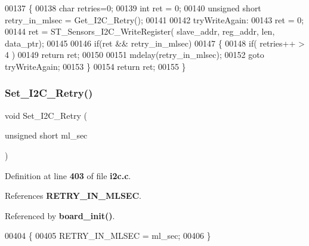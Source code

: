 \begin{DoxyCode}
00137 \{
00138   \textcolor{keywordtype}{char} retries=0;
00139   \textcolor{keywordtype}{int} ret = 0;
00140   \textcolor{keywordtype}{unsigned} \textcolor{keywordtype}{short} retry\_in\_mlsec = Get_I2C_Retry();
00141                               
00142 tryWriteAgain:  
00143   ret = 0;
00144   ret = ST_Sensors_I2C_WriteRegister( slave\_addr, reg\_addr, len, data\_ptr); 
00145 
00146   \textcolor{keywordflow}{if}(ret && retry\_in\_mlsec)
00147   \{
00148     \textcolor{keywordflow}{if}( retries++ > 4 )
00149         \textcolor{keywordflow}{return} ret;
00150     
00151     mdelay(retry\_in\_mlsec);
00152     \textcolor{keywordflow}{goto} tryWriteAgain;
00153   \}
00154   \textcolor{keywordflow}{return} ret;  
00155 \}
\end{DoxyCode}
\mbox{\label{i2c_8h_a463aa366d8082caef51ff67c162c0a19}} 
\subsubsection{Set\+\_\+\+I2\+C\+\_\+\+Retry()}
{\footnotesize\ttfamily void Set\+\_\+\+I2\+C\+\_\+\+Retry (\begin{DoxyParamCaption}\item[{unsigned short}]{ml\+\_\+sec }\end{DoxyParamCaption})}



Definition at line \textbf{ 403} of file \textbf{ i2c.\+c}.



References \textbf{ R\+E\+T\+R\+Y\+\_\+\+I\+N\+\_\+\+M\+L\+S\+EC}.



Referenced by \textbf{ board\+\_\+init()}.


\begin{DoxyCode}
00404 \{
00405   RETRY_IN_MLSEC = ml\_sec;
00406 \}
\end{DoxyCode}
